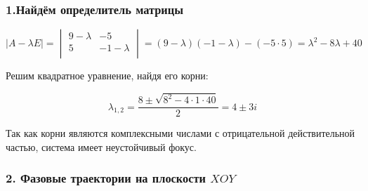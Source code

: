 \documentclass[12pt]{article}
\begin{document}
\subsubsection{1.Найдём определитель матрицы}

\[
\mid A-\lambda E \mid =
\begin{vmatrix}
9-\lambda & -5 \\
5 & -1-\lambda \\
\end{vmatrix}
= (9-\lambda)(-1-\lambda) - (-5 \cdot 5)
= \lambda^2 - 8\lambda + 40
\]

Решим квадратное уравнение, найдя его корни:

\[
\lambda_{1,2} = \frac{8 \pm \sqrt{8^2 - 4 \cdot 1 \cdot 40}}{2}
= 4 \pm 3i
\]

Так как корни являются комплексными числами с отрицательной действительной частью, система имеет неустойчивый фокус.


\subsubsection{2. Фазовые траектории на плоскости $XOY$}
\end{document}
